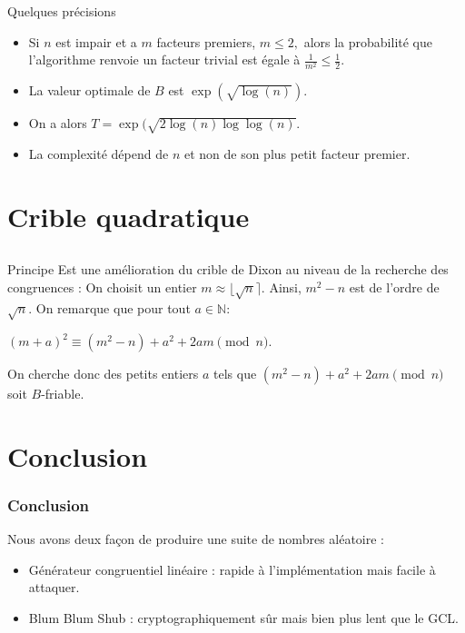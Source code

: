 \documentclass[utf8,10pt,french]{beamer}
\newcommand{\N}{\mathbb{N}}
\begin{document}
\begin{frame}{Quelques précisions}
\begin{itemize}
\item Si $n$ est impair et a $m$ facteurs premiers, $m \leq 2,$ alors la probabilité que l'algorithme renvoie un facteur trivial est égale à $\frac{1}{m^2} \leq \frac{1}{2}.$ \pause
\item La valeur optimale de $B$ est $\exp(\sqrt{\log(n)}).$
\item On a alors $T = \exp(\sqrt{2\log(n)\log\log(n)}.$
\item La complexité dépend de $n$ et non de son plus petit facteur premier.  
\end{itemize}
\end{frame}

\section{Crible quadratique}
\subsection{}
\begin{frame}{Principe}
Est une amélioration du crible de Dixon au niveau de la recherche des congruences : \pause
On choisit un entier $m \approx \lfloor\sqrt{n}\rceil.$ Ainsi, $m^2 - n$ est de l'ordre de $\sqrt{n}.$ \pause
On remarque que pour tout $a \in \N :$
\begin{center}
$(m + a)^2 \equiv (m^2 - n) + a^2 + 2am \pmod n.$
\end{center} \pause
On cherche donc des petits entiers $a$ tels que $(m^2 - n) + a^2 + 2am \pmod n$ soit $B$-friable.
\end{frame}

\section{Conclusion}
\begin{frame}
  \frametitle{Conclusion}
Nous avons deux façon de produire une suite de nombres aléatoire :\pause
\begin{itemize}
\item Générateur congruentiel linéaire : rapide à l'implémentation mais facile à attaquer.\pause
\item Blum Blum Shub : cryptographiquement sûr mais bien plus lent que le GCL.
\end{itemize}
\end{frame}
\end{document}
